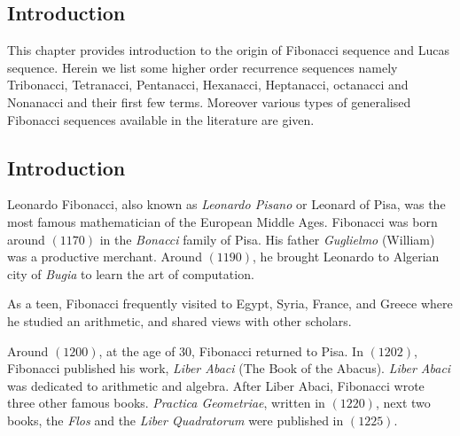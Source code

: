 \newpage
\def\baselinestretch{1.80}
\begin{large}
\pagestyle{fancy}
\renewcommand{\sectionmark}[1]{\markright{#1}}
 \chead{}
\renewcommand{\headrulewidth}{0.01pt}
\renewcommand{\footrulewidth}{0.01pt}

\chapter{Introduction}
This chapter provides introduction to the origin of Fibonacci sequence and  Lucas sequence. Herein we list some higher order recurrence sequences namely Tribonacci, Tetranacci, Pentanacci, Hexanacci, Heptanacci, octanacci and Nonanacci and their first few terms. Moreover various types of generalised Fibonacci sequences available in the literature are given. 
\label{chap:intro}
\section*{Introduction}
\noindent Leonardo Fibonacci, also known as \textit{Leonardo Pisano} or Leonard of Pisa, was the most famous mathematician of the European Middle Ages. Fibonacci was born around $(1170)$ in the \textit{Bonacci} family of Pisa. His father \textit{Guglielmo} (William) was a productive merchant. Around $(1190)$,  he brought Leonardo to Algerian city of \textit{Bugia} to learn the art of computation.

\noindent As a teen, Fibonacci frequently visited to Egypt, Syria, France, and Greece  where he studied an arithmetic, and shared views with other scholars. 

\noindent Around $(1200)$, at the age of $30$, Fibonacci returned  to Pisa. In $(1202)$, Fibonacci published his work, \textit{Liber Abaci} (The Book of the Abacus). \textit{Liber Abaci} was dedicated to arithmetic and algebra. 
\noindent After Liber Abaci, Fibonacci wrote three other famous books. \textit{Practica Geometriae}, written in $(1220)$, next two books, the \textit{Flos} and the \textit{Liber Quadratorum}  were published in $(1225)$. 


\end{large}
